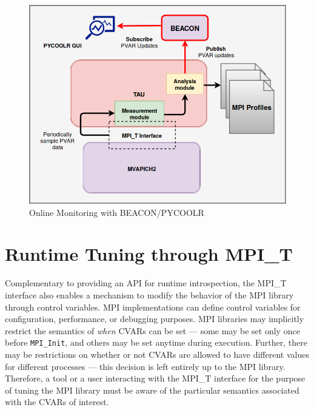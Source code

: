 \begin{center}
        \begin{figure}[tbp!]
        \centering
                \includegraphics[scale=0.35,keepaspectratio]{figures/Online_Monitoring_Design}
                \caption{Online Monitoring with BEACON/PYCOOLR}
                \label{fig:onlinemonitoringdesign}
        \end{figure}
\end{center}

\section{Runtime Tuning through MPI\_T}
Complementary to providing an API for runtime introspection, the MPI\_T interface also enables a mechanism to modify the behavior of the MPI library through control variables. MPI implementations can define control variables for configuration, performance, or debugging purposes. MPI libraries may implicitly restrict the semantics of \textit{when} CVARs can be set --- some may be set only once before \verb+MPI_Init+, and others may be set anytime during execution. Further, there may be restrictions on whether or not CVARs are allowed to have different values for different processes --- this decision is left entirely up to the MPI library. Therefore, a tool or a user interacting with the MPI\_T interface for the purpose of tuning the MPI library must be aware of the particular semantics associated with the CVARs of interest.
